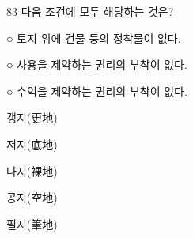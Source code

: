 \begin{question}{83}
다음 조건에 모두 해당하는 것은?
\begin{framedtext}
○ 토지 위에 건물 등의 정착물이 없다. \par
○ 사용을 제약하는 권리의 부착이 없다. \par
○ 수익을 제약하는 권리의 부착이 없다.
\end{framedtext}
\begin{choices}
  \item 갱지(更地)
  \item 저지(底地)
  \item 나지(裸地)
  \item 공지(空地)
  \item 필지(筆地)
\end{choices}
\end{question}
